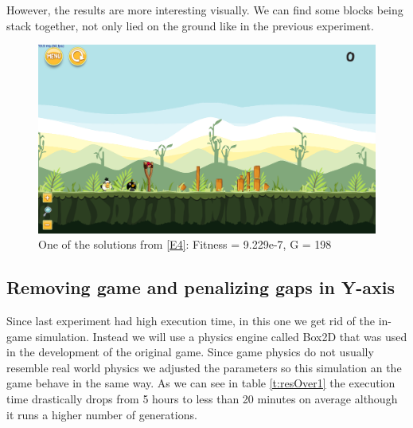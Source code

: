 \documentclass[sigconf]{acmart}
\begin{document}
However, the results are more interesting visually. We can find some blocks 
being stack together, not only lied on the ground like in the previous 
experiment. 
\begin{figure}
	\centering
	\includegraphics[scale=0.2]{level-0-second_crossover_min10_180602_035405.png}
	\caption{One of the solutions from \ref{E4}: Fitness = 9.229e-7, G = 198 }\label{f:e4-1}
\end{figure}

\subsection{Removing game and penalizing gaps in Y-axis}\label{E5}

Since last experiment had high execution time, in this one we get
rid of the in-game simulation. Instead we will use a physics engine
called Box2D that was used in the development of the original game.
Since game physics do not usually resemble real world physics we adjusted
the parameters so this simulation an the game behave in the same way.
As we can see in table \ref{t:resOver1} the execution time drastically
drops from 5 hours to less than 20 minutes on average although it runs
a higher number of generations.
\end{document}
